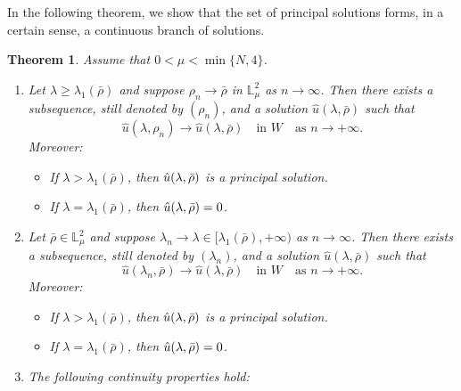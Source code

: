 \documentclass[12pt,thmsa]{article}
\newtheorem{theorem}{Theorem}[section]
\begin{document}
In the following theorem, we show that the set of principal solutions forms,
in a certain sense, a continuous branch of solutions.

\begin{theorem}
\label{thm3} Assume that $0<\mu <\min \{N,4\}$.

\begin{enumerate}
\item[$(i)$] Let $\lambda \geq \lambda _{1}(\bar{\rho})$ and suppose $\rho
_{n}\rightarrow \bar{\rho}$ in $\mathbb{L}_{\mu }^{2}$ as $n\rightarrow
\infty $. Then there exists a subsequence, still denoted by $(\rho _{n})$,
and a solution $\hat{u}(\lambda ,\bar{\rho})$ such that
\begin{equation*}
\hat{u}(\lambda ,\rho _{n})\rightarrow \hat{u}(\lambda ,\bar{\rho})\quad
\text{in }W\quad \text{as }n\rightarrow +\infty .
\end{equation*}%
Moreover:

\begin{itemize}
\item If $\lambda >\lambda _{1}(\bar{\rho})$, then $\hat{u}(\lambda ,\bar{%
\rho})$ is a principal solution.

\item If $\lambda =\lambda _{1}(\bar{\rho})$, then $\hat{u}(\lambda ,\bar{%
\rho})=0$.
\end{itemize}

\item[$(ii)$] Let $\bar{\rho}\in \mathbb{L}_{\mu }^{2}$ and suppose $\lambda
_{n}\rightarrow \lambda \in \lbrack \lambda _{1}(\bar{\rho}),+\infty )$ as $%
n\rightarrow \infty $. Then there exists a subsequence, still denoted by $%
(\lambda _{n})$, and a solution $\hat{u}(\lambda ,\bar{\rho})$ such that
\begin{equation*}
\hat{u}(\lambda _{n},\bar{\rho})\rightarrow \hat{u}(\lambda ,\bar{\rho}%
)\quad \text{in }W\quad \text{as }n\rightarrow +\infty .
\end{equation*}%
Moreover:

\begin{itemize}
\item If $\lambda >\lambda _{1}(\bar{\rho})$, then $\hat{u}(\lambda ,\bar{%
\rho})$ is a principal solution.

\item If $\lambda =\lambda _{1}(\bar{\rho})$, then $\hat{u}(\lambda ,\bar{%
\rho})=0$.
\end{itemize}

\item[$(iii)$] The following continuity properties hold:


\end{enumerate}
\end{theorem}
\end{document}
